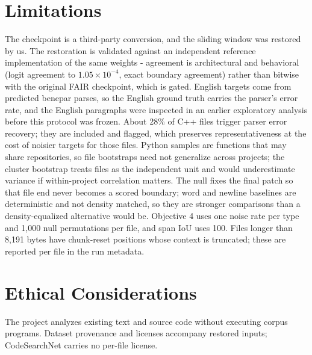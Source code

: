 \section*{Limitations}
The checkpoint is a third-party conversion, and the sliding window was restored by us. The restoration is validated against an independent reference implementation of the same weights - agreement is architectural and behavioral (logit agreement to $1.05\times10^{-4}$, exact boundary agreement) rather than bitwise with the original FAIR checkpoint, which is gated. English targets come from predicted benepar parses, so the English ground truth carries the parser's error rate, and the English paragraphs were inspected in an earlier exploratory analysis before this protocol was frozen. About 28\% of C++ files trigger parser error recovery; they are included and flagged, which preserves representativeness at the cost of noisier targets for those files. Python samples are functions that may share repositories, so file bootstraps need not generalize across projects; the cluster bootstrap treats files as the independent unit and would underestimate variance if within-project correlation matters. The null fixes the final patch so that file end never becomes a scored boundary; word and newline baselines are deterministic and not density matched, so they are stronger comparisons than a density-equalized alternative would be. Objective 4 uses one noise rate per type and 1{,}000 null permutations per file, and span IoU uses 100. Files longer than 8{,}191 bytes have chunk-reset positions whose context is truncated; these are reported per file in the run metadata.

\section*{Ethical Considerations}
The project analyzes existing text and source code without executing corpus programs. Dataset provenance and licenses accompany restored inputs; CodeSearchNet carries no per-file license.



